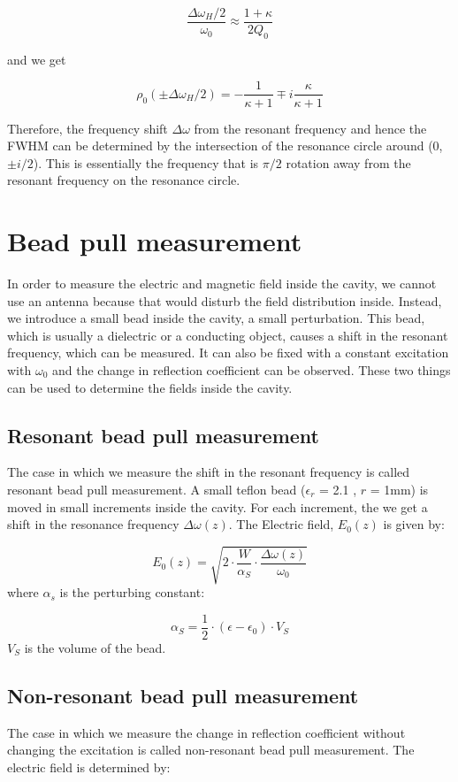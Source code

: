 \documentclass[a4paper]{article}
\numberwithin{equation}{section}
\begin{document}
\[
		\frac{\Delta \omega_{H}/2}{\omega_{0}} \approx \frac{1 + \kappa}{2Q_{0}}	
\]

and we get 

\[
		\rho_{0}(\pm \Delta \omega_{H}/2) = -\frac{1}{\kappa + 1} \mp i\frac{\kappa}{\kappa + 1}
\]

Therefore, the frequency shift $\Delta \omega$ from the resonant frequency and hence the FWHM can be determined by the intersection of the resonance circle around (0, $\pm i/2$).
This is essentially the frequency that is $\pi / 2$ rotation away from the resonant frequency on the resonance circle. 

\section{Bead pull measurement}
In order to measure the electric and magnetic field inside the cavity, we cannot use an antenna because that would disturb the field distribution inside. Instead, we introduce a small bead inside the cavity, a small perturbation. This bead, which is usually a dielectric or a conducting object, causes a shift in the resonant frequency, which can be measured. It can also be fixed with a constant excitation with $\omega_{0}$ and the change in reflection coefficient can be observed. These two things can be used to determine the fields inside the cavity. 

\subsection{Resonant bead pull measurement}
The case in which we measure the shift in the resonant frequency is called resonant bead pull measurement. A small teflon bead ($\epsilon_{r}$ = 2.1 , $r$ = 1mm) is moved in small increments inside the cavity. For each increment, the we get a shift in the resonance frequency $\Delta \omega(z)$. The Electric field, $E_{0}(z)$ is given by:

\begin{equation} \label{eqn:E0_res}
		E_{0}(z) = \sqrt{2 \cdot \frac{W}{\alpha_{S}}\cdot \frac{\Delta \omega(z)}{\omega_{0}}}
\end{equation}
where $\alpha_{s}$ is the perturbing constant: 

\[
		\alpha_{S} = \frac{1}{2} \cdot (\epsilon - \epsilon_{0}) \cdot V_{S}
\]
$V_{S}$ is the volume of the bead. 

\subsection{Non-resonant bead pull measurement}
The case in which we measure the change in reflection coefficient without changing the excitation is called non-resonant bead pull measurement. The electric field is determined by: 
\end{document}
